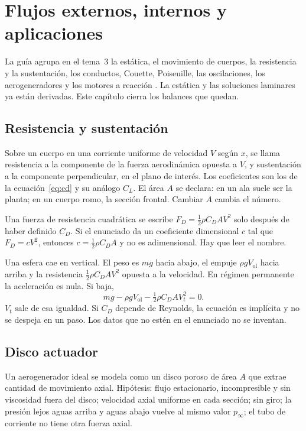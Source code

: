 \chapter{Flujos externos, internos y aplicaciones}
\label{ch:aplicaciones}

La guía agrupa en el tema~3 la estática, el movimiento de cuerpos, la resistencia y la sustentación, los conductos, Couette, Poiseuille, las oscilaciones, los aerogeneradores y los motores a reacción \parencite{uleGuia2026}. La estática y las soluciones laminares ya están derivadas. Este capítulo cierra los balances que quedan.

\section{Resistencia y sustentación}

Sobre un cuerpo en una corriente uniforme de velocidad \(V\) según \(x\), se llama resistencia a la componente de la fuerza aerodinámica opuesta a \(V\), y sustentación a la componente perpendicular, en el plano de interés. Los coeficientes son los de la ecuación~\eqref{eq:cd} y su análogo \(C_L\). El área \(A\) se declara: en un ala suele ser la planta; en un cuerpo romo, la sección frontal. Cambiar \(A\) cambia el número.

Una fuerza de resistencia cuadrática se escribe \(F_D=\tfrac12\rho C_D A V^2\) solo después de haber definido \(C_D\). Si el enunciado da un coeficiente dimensional \(c\) tal que \(F_D=c V^2\), entonces \(c=\tfrac12\rho C_D A\) y no es adimensional. Hay que leer el nombre.

\begin{examplebox}
Una esfera cae en vertical. El peso es \(mg\) hacia abajo, el empuje \(\rho g V_{\mathrm{ol}}\) hacia arriba y la resistencia \(\tfrac12\rho C_D A V^2\) opuesta a la velocidad. En régimen permanente la aceleración es nula. Si baja,
\[
mg-\rho g V_{\mathrm{ol}}-\tfrac12\rho C_D A V_t^2=0.
\]
\(V_t\) sale de esa igualdad. Si \(C_D\) depende de Reynolds, la ecuación es implícita y no se despeja en un paso. Los datos que no estén en el enunciado no se inventan.
\end{examplebox}

\section{Disco actuador}

Un aerogenerador ideal se modela como un disco poroso de área \(A\) que extrae cantidad de movimiento axial. Hipótesis: flujo estacionario, incompresible y sin viscosidad fuera del disco; velocidad axial uniforme en cada sección; sin giro; la presión lejos aguas arriba y aguas abajo vuelve al mismo valor \(p_\infty\); el tubo de corriente no tiene otra fuerza axial.

